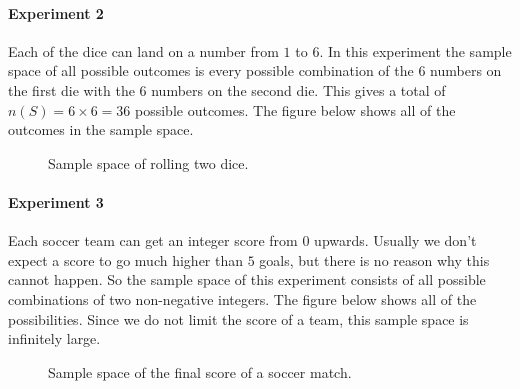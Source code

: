 \paragraph{Experiment 2} Each of the dice can land on a number from $1$
to $6$. In this experiment the sample space of all possible outcomes is
every possible combination of the $6$ numbers on the first die with the
$6$ numbers on the second die. This gives a total of \(n(S) = 6 \times 6
= 36\) possible outcomes. The figure below shows all of the outcomes
in the sample space.

\begin{figure}[H]
\begin{center}
\end{center}
  \caption{Sample space of rolling two dice.}
\end{figure} 

\paragraph{Experiment 3} Each soccer team can get an integer score
from $0$ upwards. Usually we don't expect a score to go much higher than
$5$ goals, but there is no reason why this cannot happen. So the sample
space of this experiment consists of all possible combinations of two
non-negative integers. The figure below shows all of the
possibilities. Since we do not limit the score of a team, this sample
space is infinitely large.

\begin{figure}[H]
\begin{center}
\end{center}
  \caption{Sample space of the final score of a soccer match.}
\end{figure}

